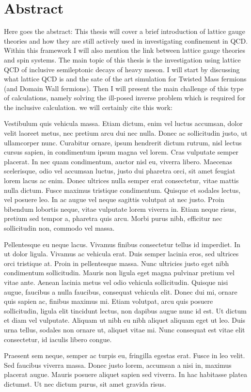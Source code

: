 \chapter*{Abstract}

Here goes the abstract: This thesis will cover a brief introduction of lattice gauge theories and how they are still actively used in investigating confinement in QCD. Within this framework I will also mention the link between lattice gauge theories and spin systems.
The main topic of this thesis is the investigation using lattice QCD of inclusive semileptonic decays of heavy meson. I will start by discussing what lattice QCD is and the sate of the art simulation for Twisted Mass fermions (and Domain Wall fermions). Then I will present the main challenge of this type of calculations, namely solving the ill-posed inverse problem which is required for the inclusive calculation. we will certainly cite this work: \cite{Gambino:2022dvu}

Vestibulum quis vehicula massa. Etiam dictum, enim vel luctus accumsan, dolor velit laoreet metus, nec pretium arcu dui nec nulla. Donec ac sollicitudin justo, ut ullamcorper nunc. Curabitur ornare, ipsum hendrerit dictum rutrum, nisl lectus cursus sapien, in condimentum ipsum magna vel lorem. Cras vulputate semper placerat. In nec quam condimentum, auctor nisl eu, viverra libero. Maecenas scelerisque, odio vel accumsan luctus, justo dui pharetra orci, sit amet feugiat lorem lacus ac enim. Donec ultrices nulla semper erat consectetur, vitae mattis nulla dictum. Fusce maximus tristique condimentum. Quisque et sodales lectus, vel posuere leo. In ac augue vel neque sagittis volutpat at nec justo. Proin bibendum lobortis neque, vitae vulputate lorem viverra in. Etiam neque risus, pretium sed tempor a, pharetra quis arcu. Morbi purus nibh, efficitur nec sollicitudin non, commodo vel massa.

Pellentesque eu neque lacus. Vivamus finibus consectetur tellus id imperdiet. In ut dolor ligula. Vivamus ac vehicula erat. Duis semper lacinia eros, sed ultrices orci tristique at. Proin in pellentesque massa. Nunc ultricies justo eget nibh condimentum sollicitudin. Mauris non ligula eget magna pulvinar pretium vel vitae ante. Aenean lacinia metus vel odio vehicula sollicitudin. Quisque nisi augue, faucibus a nulla faucibus, consequat vehicula elit. Donec dui mi, ornare quis sapien ac, finibus maximus mi. Etiam volutpat, arcu quis posuere sollicitudin, ligula elit tincidunt lectus, non dapibus augue nunc id est. Ut dictum et diam vel vulputate. Aliquam ut nibh eu nibh aliquet aliquam eget ut leo. Duis urna tellus, sodales non ornare ut, aliquet vitae mi. Nunc consequat est vitae elit consectetur, id iaculis libero congue.

Praesent sem neque, semper ac turpis eu, fringilla egestas erat. Fusce in leo velit. Sed faucibus viverra massa. Donec justo lorem, accumsan a nisi in, maximus placerat augue. Mauris posuere aliquet sapien sed viverra. In hac habitasse platea dictumst. Ut nec dictum purus, sit amet gravida risus.
